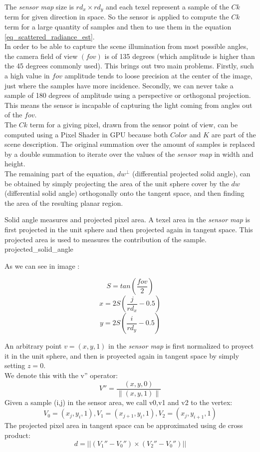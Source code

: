 \documentclass[10pt, conference]{IEEEtran}
\begin{document}
The \emph{sensor map} size is $rd_x \times rd_y$ and each texel represent a sample of the $Ck$ term for given direction in space. So the sensor is applied to compute the $Ck$ term for a large quantity of samples and then to use them in the equation \ref{eq_scattered_radiance_est}.\\
In order to be able to capture the scene illumination from most possible angles, the camera field of view $(fov)$ is of 135 degrees (which amplitude is higher than the 45 degrees commonly used). This brings out two main problems. Firstly, such a high value in $fov$ amplitude tends to loose precision at the center of the image, just where the samples have more incidence. Secondly, we can never take a sample of 180 degrees of amplitude using a perspective or orthogonal projection. This means the sensor is incapable of capturing the light coming from angles out of the $fov$.\\
The $Ck$ term for a giving pixel, drawn from the sensor point of view, can be computed using a Pixel Shader in GPU because both $Color$ and $K$ are part of the scene description. The original summation over the amount of samples is replaced by a double summation to iterate over the values of the \emph{sensor map} in width and height.\\

The remaining part of the equation, $dw^\perp$ (differential projected solid angle), can be obtained by simply projecting the area of the unit sphere 
cover by the $dw$ (differential solid angle) orthogonally onto the tangent space, and then finding the area of the resulting planar region.

\subimages
	{Solid angle measures and projected pixel area. 
	A texel area in the \emph{sensor map} is first projected in the unit sphere and then projected again in tangent space. 
	This projected area is used to measures the contribution of the sample.}
	{projected_solid_angle}{
}

As we can see in image :

\[ S = tan(\frac{fov}{2}) \]
\[ x = 2S(\frac{j}{rd_x} - 0.5) \]
\[ y = 2S(\frac{i}{rd_y} - 0.5) \]

An arbitrary point $v = (x,y,1)$ in the \emph{sensor map} is first normalized to proyect it in the unit sphere, and then is proyected again in tangent space by simply setting $z = 0$.\\ 
We denote this with the v'' operator:\\
\[ 
	V'' = \frac{(x, y, 0)} { \left\| (x,y,1) \right\| } 
\]
Given a sample (i,j) in the sensor area, we call v0,v1 and v2 to the vertex:\\
\[ 
	V_0 = (x_j, y_i, 1), V_1 = (x_{j+1}, y_i, 1), V_2 = (x_j, y_{i+1}, 1) 
\]
The projected pixel area in tangent space can be approximated using de cross product:\\
\begin{equation}
	\label{eq_d}
	d = ||(V_1'' - V_0'') \times (V_2'' - V_0'')||
\end{equation}
\end{document}
